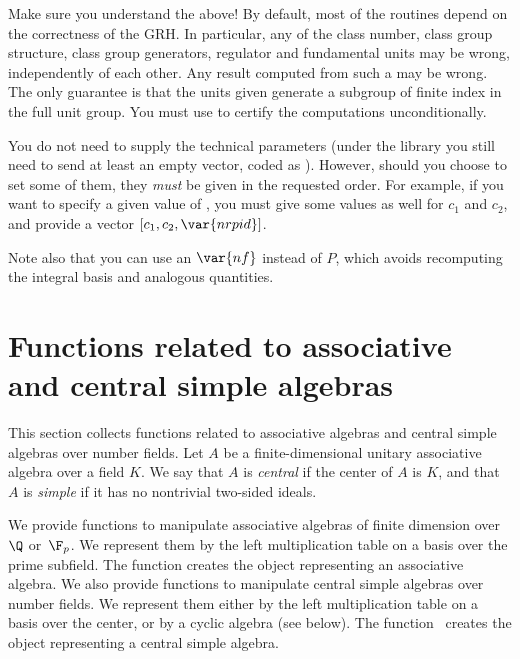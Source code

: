  Make sure you understand the above! By default, most of
the  routines depend on the correctness of the GRH. In particular,
any of the class number, class group structure, class group generators,
regulator and fundamental units may be wrong, independently of each other.
Any result computed from such a  may be wrong. The only guarantee is
that the units given generate a subgroup of finite index in the full unit
group. You must use  to certify the computations
unconditionally.


You do not need to supply the technical parameters (under the library you
still need to send at least an empty vector, coded as ). However,
should you choose to set some of them, they \emph{must} be given in the
requested order. For example, if you want to specify a given value of
, you must give some values as well for $c_1$ and $c_2$, and provide
a vector $[c_1,c_2,\var{nrpid}]$.

Note also that you can use an $\var{nf}$ instead of $P$, which avoids
recomputing the integral basis and analogous quantities.

\smallskip


\section{Functions related to associative and central simple algebras}

This section collects functions related to associative algebras and central
simple algebras over number fields. Let $A$ be a finite-dimensional unitary
associative algebra over a field $K$. We say that $A$ is \emph{central} if
the center of $A$ is $K$, and that $A$ is \emph{simple} if it has no
nontrivial two-sided ideals.

\par We provide functions to manipulate associative algebras of finite
dimension over~$\Q$ or~$\F_p$. We represent them by the left multiplication
table on a basis over the prime subfield. The function 
creates the object representing an associative algebra. We also provide
functions to manipulate central simple algebras over number fields. We
represent them either by the left multiplication table on a basis over the
center, or by a cyclic algebra (see below). The function~ creates
the object representing a central simple algebra.

